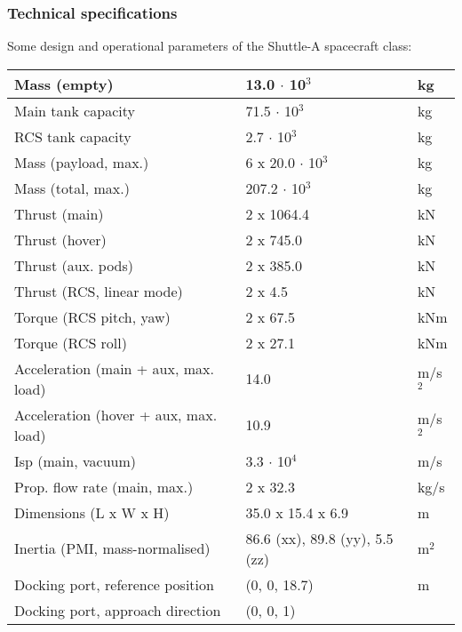 \documentclass[Orbiter User Manual.tex]{subfiles}
\begin{document}
\subsubsection{Technical specifications}
Some design and operational parameters of the Shuttle-A spacecraft class:

	\begin{longtable}{ |p{}|p{}|p{}| }
	\hline\rule{0pt}{2ex}
	Mass (empty) & 13.0 $\cdot$ 10$^{3}$ & kg\\
	\hline\rule{0pt}{2ex}
	Main tank capacity & 71.5 $\cdot$ 10$^{3}$ & kg\\
	\hline\rule{0pt}{2ex}
	RCS tank capacity & 2.7 $\cdot$ 10$^{3}$ & kg\\
	\hline\rule{0pt}{2ex}
	Mass (payload, max.) & 6 x 20.0 $\cdot$ 10$^{3}$ & kg\\
	\hline\rule{0pt}{2ex}
	Mass (total, max.) & 207.2 $\cdot$ 10$^{3}$ & kg\\
	\hline\rule{0pt}{2ex}
	Thrust (main) & 2 x 1064.4 & kN\\
	\hline\rule{0pt}{2ex}
	Thrust (hover) & 2 x 745.0 & kN\\
	\hline\rule{0pt}{2ex}
	Thrust (aux. pods) & 2 x 385.0 & kN\\
	\hline\rule{0pt}{2ex}
	Thrust (RCS, linear mode) & 2 x 4.5 & kN\\
	\hline\rule{0pt}{2ex}
	Torque (RCS pitch, yaw) & 2 x 67.5 & kNm\\
	\hline\rule{0pt}{2ex}
	Torque (RCS roll) & 2 x 27.1 & kNm\\
	\hline\rule{0pt}{2ex}
	Acceleration (main + aux, max. load) & 14.0 & m/s$^{2}$\\
	\hline\rule{0pt}{2ex}
	Acceleration (hover + aux, max. load) & 10.9 & m/s$^{2}$\\
	\hline\rule{0pt}{2ex}
	Isp (main, vacuum) & 3.3 $\cdot$ 10$^{4}$ & m/s\\
	\hline\rule{0pt}{2ex}
	Prop. flow rate (main, max.) & 2 x 32.3 & kg/s\\
	\hline\rule{0pt}{2ex}
	Dimensions (L x W x H) & 35.0 x 15.4 x 6.9 & m\\
	\hline\rule{0pt}{2ex}
	Inertia (PMI, mass-normalised) & 86.6 (xx), 89.8 (yy), 5.5 (zz) & m$^{2}$\\
	\hline\rule{0pt}{2ex}
	Docking port, reference position & (0, 0, 18.7) & m\\
	\hline\rule{0pt}{2ex}
	Docking port, approach direction & (0, 0, 1) & \\
	\hline
	\end{longtable}
\end{document}
